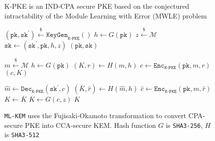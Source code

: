 \documentclass[runningheads]{llncs}
\newcommand{\keygen}{\texttt{KeyGen}}
\newcommand{\encrypt}{\texttt{Enc}}
\newcommand{\decrypt}{\texttt{Dec}}
\newcommand{\encap}{\texttt{Encap}}
\newcommand{\decap}{\texttt{Decap}}
\newcommand{\pk}{\texttt{pk}}
\newcommand{\sk}{\texttt{sk}}
\newcommand{\leftsample}{\stackrel{\$}{\leftarrow}}
\begin{document}
\begin{figure}[h]
    \caption{K-PKE is an IND-CPA secure PKE based on the conjectured intractability of the Module Learning with Error (MWLE) problem}\label{fig:k-pke-routines}
\end{figure}


\begin{figure}[h]
    \centering
    
    \begin{minipage}[t]{0.35\textwidth}
        \begin{algorithm}[H]
            \caption*{$\keygen_\texttt{ML-KEM}()$}
            \begin{algorithmic}[1]
                \State $(\pk, \sk^\prime) \leftsample \keygen_\texttt{K-PKE}()$
                \State $h \leftarrow G(\pk)$
                \State $z \leftsample \mathcal{M}$
                \State $\sk \leftarrow (\sk^\prime, \pk, h, z)$
                \State \Return $(\pk, \sk)$
            \end{algorithmic}
        \end{algorithm} \vspace{-0.5cm}
    \end{minipage}
    \begin{minipage}[t]{0.3\textwidth}
        \begin{algorithm}[H]
            \caption*{$\encap_\texttt{ML-KEM}(\pk)$}
            \begin{algorithmic}[1]
                \State $m \leftsample \mathcal{M}$
                \State $h \leftarrow G(\pk)$
                \State $(K, r) \leftarrow H(m, h)$
                \State $c \leftarrow \encrypt_\texttt{K-PKE}(\pk, m ,r)$
                \State \Return $(c, K)$
            \end{algorithmic}
        \end{algorithm}
    \end{minipage}
    \begin{minipage}[t]{0.33\textwidth}
        \begin{algorithm}[H]
            \caption*{$\decap_\texttt{ML-KEM}(\sk, c)$}
            \begin{algorithmic}[1]
                \State $\hat{m} \leftarrow \decrypt_\texttt{K-PKE}(\sk^\prime, c)$
                \State $(\overline{K}, \hat{r}) \leftarrow H(\hat{m}, h)$
                \State $\hat{c} \leftarrow \encrypt_\texttt{K-PKE}(\pk, m, \hat{r})$
                    \State $K \leftarrow \overline{K}$
                \Else 
                    \State $K \leftarrow G(c, z)$
                \EndIf
                \State \Return $K$
            \end{algorithmic}
        \end{algorithm}
    \end{minipage}

    \caption{\texttt{ML-KEM} uses the Fujisaki-Okamoto transformation to convert CPA-secure PKE into CCA-secure KEM. Hash function $G$ is \texttt{SHA3-256}, $H$ is \texttt{SHA3-512}}\label{fig:ml-kem-routines}
\end{figure}
\end{document}
